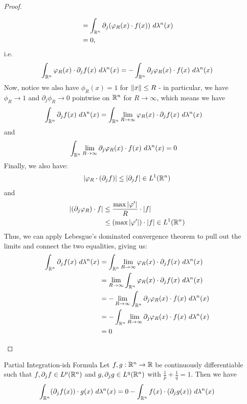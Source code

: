 \begin{proof}
\begin{enumerate}
\begin{align*}
			&=
			\int_{\mathbb{R}^n} \partial_j (\varphi_R(x) \cdot f(x)) ~d\lambda^n(x)\\ &= 0,
		\end{align*}
		i.e.
		\begin{align*}
			\int_{\mathbb{R}^n} \varphi_R(x) \cdot \partial_j f(x) ~d\lambda^n(x)
			= -
			\int_{\mathbb{R}^n} \partial_j \varphi_R(x) \cdot f(x) ~d\lambda^n(x)
		\end{align*}
		Now, notice we also have $\phi_R(x) = 1$ for $\norm{x} \leq R$ - in particular, we have $\phi_R \to 1$ and $\partial_j \phi_R \to 0$ pointwise on $\mathbb{R}^n$ for $R \to \infty$, which means we have
		\begin{align*}
			\int_{\mathbb{R}^n} \partial_j f(x) ~d\lambda^n(x)
			&= \int_{\mathbb{R}^n} \lim_{R \to \infty}\varphi_R(x) \cdot \partial_j f(x) ~d\lambda^n(x)
		\end{align*}
		and
		\begin{align*}
			\int_{\mathbb{R}^n}  \lim_{R \to \infty}\partial_j \varphi_R(x) \cdot f(x) ~d\lambda^n(x)
			&= 0
		\end{align*}
		Finally, we also have:
		\begin{align*}
			\abs{\varphi_R \cdot (\partial_j f)}
			\leq \abs{\partial_j f} \in L^1(\mathbb{R}^n)
		\end{align*}
		and
		\begin{align*}
			\abs{(\partial_j \varphi_R) \cdot f}
			&\leq
			\frac{\max \abs{\varphi'}}{R} \cdot \abs{f}\\
			&\leq
			(\max \abs{\varphi'}) \cdot \abs{f} \in 
			L^1(\mathbb{R}^n)
		\end{align*}
		Thus, we can apply Lebesgue's dominated convergence theorem to pull out the limits and connect the two equalities, giving us:
		\begin{align*}
			\int_{\mathbb{R}^n} \partial_j f(x) ~d\lambda^n(x)
			&= \int_{\mathbb{R}^n} \lim_{R \to \infty}\varphi_R(x) \cdot \partial_j f(x) ~d\lambda^n(x)\\
			&= \lim_{R \to \infty} \int_{\mathbb{R}^n} \varphi_R(x) \cdot \partial_j f(x) ~d\lambda^n(x)\\
			&= -\lim_{R \to \infty} \int_{\mathbb{R}^n}  \partial_j \varphi_R(x) \cdot f(x) ~d\lambda^n(x)\\
			&= -\int_{\mathbb{R}^n}  \lim_{R \to \infty}\partial_j \varphi_R(x) \cdot f(x) ~d\lambda^n(x)\\
			&= 0
		\end{align*}
	\end{enumerate}
	
\end{proof}
\begin{importantcorollary}{Partial Integration-ish Formula}{}
	Let $f, g : \mathbb{R}^n \to \mathbb{R}$ be continuously differentiable such that $f, \partial_j f \in L^p(\mathbb{R}^n)$ and $g, \partial_j g \in L^q(\mathbb{R}^n)$ with $\frac{1}{p} + \frac{1}{q} = 1$. Then we have
	\begin{align*}
		\int_{\mathbb{R}^n} (\partial_j f(x)) \cdot g(x) ~d\lambda^n(x) = 0 - \int_{\mathbb{R}^n} f(x) \cdot (\partial_j g(x)) ~d\lambda^n(x)
	\end{align*}
\end{importantcorollary}
